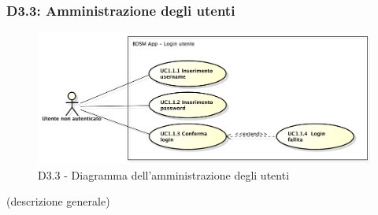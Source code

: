 		\subsubsection{D3.3: Amministrazione degli utenti} %
		\label{ssub:amministrazione_degli_utenti}
		\begin{figure}[!htbp]
			\centering
			\centerline{\includegraphics[scale=0.45]{./images/UC1_1.pdf}}
			\caption{D3.3 - Diagramma dell'amministrazione degli utenti}
		\end{figure}
		\noindent
		[TO DO] (descrizione generale)








